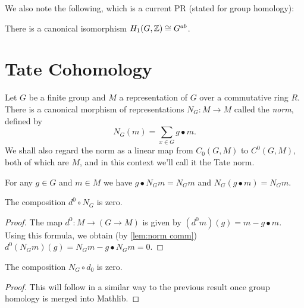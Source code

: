 We also note the following, which is a current PR (stated for group homology):

\begin{lemma}
	\label{lem:homology 1 Z}
	\leanok
	There is a canonical isomorphism $H_{1}(G,{\mathbb Z}) \cong G^{ab}$.
\end{lemma}


\section{Tate Cohomology}

\begin{definition}
	\label{def:norm}
	Let $G$ be a finite group and $M$ a representation of $G$ over a commutative ring $R$.
	There is a canonical morphism of representations $N_G : M \to M$ called the \emph{norm},
	defined by
	\[
		N_G(m) = \sum_{x \in G} g \bullet m.
	\]
	We shall also regard the norm as a linear map from $C_0(G,M)$ to $C^0(G,M)$, both of which are
	$M$, and in this context we'll call it the Tate norm.
\end{definition}


\begin{lemma}
	\label{lem:norm comm}
	\leanok
	For any $g \in G$ and $m \in M$ we have $g \bullet N_G m = N_G m$
	and $N_G (g \bullet m) = N_G m$.
\end{lemma}



\begin{lemma}
	\label{lem:norm comp d}
	\leanok
	The composition $d^0 \circ N_G$ is zero.
\end{lemma}

\begin{proof}
	The map $d^0 : M \to (G \to M)$ is given by
	$(d^0 m)(g) = m - g\bullet m$.
	Using this formula, we obtain (by \ref{lem:norm comm})
	$d^0 (N_G m) (g) = N_G m - g \bullet N_G m = 0$.
\end{proof}


\begin{lemma}
	\label{lem:d comp norm}
	The composition $N_G \circ d_0$ is zero.
\end{lemma}

\begin{proof}
	This will follow in a similar way to the previous result
	once group homology is merged into Mathlib.
\end{proof}




